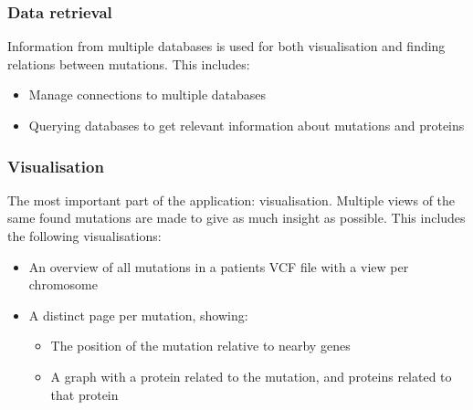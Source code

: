 \subsubsection{Data retrieval}

Information from multiple databases is used for both visualisation and finding relations between mutations. This includes:

\begin{itemize}
  \item Manage connections to multiple databases
  \item Querying databases to get relevant information about mutations and proteins
\end{itemize}

\subsubsection{Visualisation}

The most important part of the application: visualisation. Multiple views of the same found mutations are made to give as much insight as possible. This includes the following visualisations:

\begin{itemize}
  \item An overview of all mutations in a patients VCF file with a view per chromosome
  \item A distinct page per mutation, showing:
  \begin{itemize}
     \item The position of the mutation relative to nearby genes
     \item A graph with a protein related to the mutation, and proteins related to that protein
  \end{itemize}
\end{itemize}